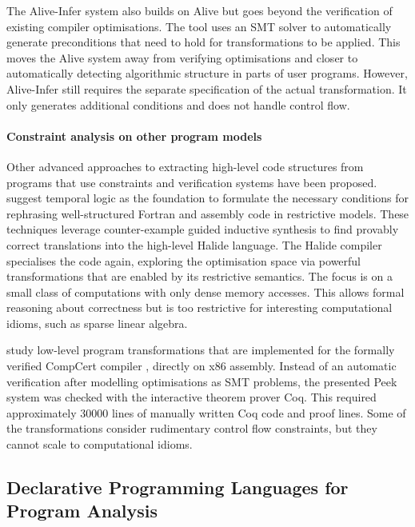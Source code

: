     The Alive-Infer system \citep{Menendez:2017:ADP:3062341.3062372} also builds
    on Alive but goes beyond the verification of existing compiler
    optimisations.
    The tool uses an SMT solver to automatically generate preconditions that
    need to hold for transformations to be applied.
    This moves the Alive system away from verifying optimisations and
    closer to automatically detecting algorithmic structure in parts of user
    programs.
    However, Alive-Infer still requires the separate specification of the actual
    transformation.
    It only generates additional conditions and does not handle control flow.

    \paragraph*{Constraint analysis on other program models}
    Other advanced approaches to extracting high-level code structures
    from programs that use constraints and verification systems have been
    proposed.
    \citet{Mendis2015Helium, Kamil2016Verified} suggest temporal logic as the
    foundation to formulate the necessary conditions for rephrasing
    well-structured Fortran and assembly code in restrictive models.
    These techniques leverage counter-example guided inductive synthesis to find
    provably correct translations into the high-level Halide language.
    The Halide compiler specialises the code again, exploring the
    optimisation space via powerful transformations that are enabled by its
    restrictive semantics.
    The focus is on a small class of computations with only
    dense memory accesses.
    This allows formal reasoning about correctness but is too restrictive for
    interesting computational idioms, such as sparse linear algebra.

    \citet{Mullen:2016:VPO:2908080.2908109} study low-level program
    transformations that are implemented for the formally verified CompCert
    compiler \citep{CompCert-ERTS-2018}, directly on x86 assembly.
    Instead of an automatic verification after modelling optimisations
    as SMT problems, the presented Peek system was checked with the interactive
    theorem prover Coq.
    This required approximately 30000 lines of manually written Coq code and
    proof lines.
    Some of the transformations consider rudimentary control flow constraints,
    but they cannot scale to computational idioms.

\subsection{Declarative Programming Languages for Program Analysis}

